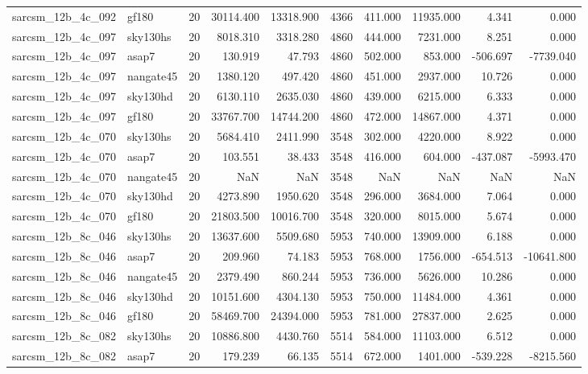 \begin{longtable}{llrrrrrrrr}
sarcsm\_12b\_4c\_092 & gf180 & 20 & 30114.400 & 13318.900 & 4366 & 411.000 & 11935.000 & 4.341 & 0.000 \\
sarcsm\_12b\_4c\_097 & sky130hs & 20 & 8018.310 & 3318.280 & 4860 & 444.000 & 7231.000 & 8.251 & 0.000 \\
sarcsm\_12b\_4c\_097 & asap7 & 20 & 130.919 & 47.793 & 4860 & 502.000 & 853.000 & -506.697 & -7739.040 \\
sarcsm\_12b\_4c\_097 & nangate45 & 20 & 1380.120 & 497.420 & 4860 & 451.000 & 2937.000 & 10.726 & 0.000 \\
sarcsm\_12b\_4c\_097 & sky130hd & 20 & 6130.110 & 2635.030 & 4860 & 439.000 & 6215.000 & 6.333 & 0.000 \\
sarcsm\_12b\_4c\_097 & gf180 & 20 & 33767.700 & 14744.200 & 4860 & 472.000 & 14867.000 & 4.371 & 0.000 \\
sarcsm\_12b\_4c\_070 & sky130hs & 20 & 5684.410 & 2411.990 & 3548 & 302.000 & 4220.000 & 8.922 & 0.000 \\
sarcsm\_12b\_4c\_070 & asap7 & 20 & 103.551 & 38.433 & 3548 & 416.000 & 604.000 & -437.087 & -5993.470 \\
sarcsm\_12b\_4c\_070 & nangate45 & 20 & NaN & NaN & 3548 & NaN & NaN & NaN & NaN \\
sarcsm\_12b\_4c\_070 & sky130hd & 20 & 4273.890 & 1950.620 & 3548 & 296.000 & 3684.000 & 7.064 & 0.000 \\
sarcsm\_12b\_4c\_070 & gf180 & 20 & 21803.500 & 10016.700 & 3548 & 320.000 & 8015.000 & 5.674 & 0.000 \\
sarcsm\_12b\_8c\_046 & sky130hs & 20 & 13637.600 & 5509.680 & 5953 & 740.000 & 13909.000 & 6.188 & 0.000 \\
sarcsm\_12b\_8c\_046 & asap7 & 20 & 209.960 & 74.183 & 5953 & 768.000 & 1756.000 & -654.513 & -10641.800 \\
sarcsm\_12b\_8c\_046 & nangate45 & 20 & 2379.490 & 860.244 & 5953 & 736.000 & 5626.000 & 10.286 & 0.000 \\
sarcsm\_12b\_8c\_046 & sky130hd & 20 & 10151.600 & 4304.130 & 5953 & 750.000 & 11484.000 & 4.361 & 0.000 \\
sarcsm\_12b\_8c\_046 & gf180 & 20 & 58469.700 & 24394.000 & 5953 & 781.000 & 27837.000 & 2.625 & 0.000 \\
sarcsm\_12b\_8c\_082 & sky130hs & 20 & 10886.800 & 4430.760 & 5514 & 584.000 & 11103.000 & 6.512 & 0.000 \\
sarcsm\_12b\_8c\_082 & asap7 & 20 & 179.239 & 66.135 & 5514 & 672.000 & 1401.000 & -539.228 & -8215.560 \\

\end{longtable}
